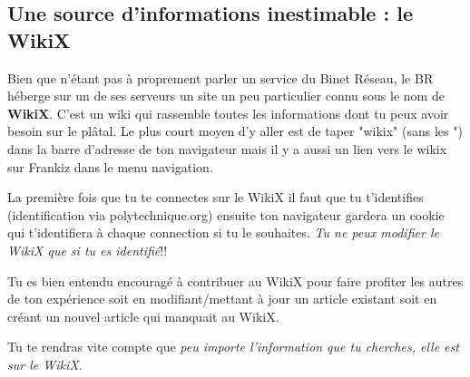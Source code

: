 
\subsection{Une source d'informations inestimable : le WikiX}
\label{WikiX}
Bien que n'\'etant pas \`a proprement parler un service du Binet R\'eseau, le BR h\'eberge sur un de ses serveurs un site un peu particulier connu sous le nom de \textbf{WikiX}. C'est un wiki qui rassemble toutes les informations dont tu peux avoir besoin sur le pl\^atal. Le plus court moyen d'y aller est de taper "wikix" (sans les ") dans la barre d'adresse de ton navigateur mais il y a aussi un lien vers le wikix sur Frankiz dans le menu navigation.

La premi\`ere fois que tu te connectes sur le WikiX il faut que tu t'identifies (identification via polytechnique.org) ensuite ton navigateur gardera un cookie qui t'identifiera \`a chaque connection si tu le souhaites. \emph{Tu ne peux modifier le WikiX que si tu es identifi\'e}!!

Tu es bien entendu encourag\'e \`a contribuer au WikiX pour faire profiter les autres de ton exp\'erience soit en modifiant/mettant \`a jour un article existant soit en cr\'eant un nouvel article qui manquait au WikiX.


Tu te rendras vite compte que \emph{peu importe l'information que tu cherches, elle est sur le WikiX.}
